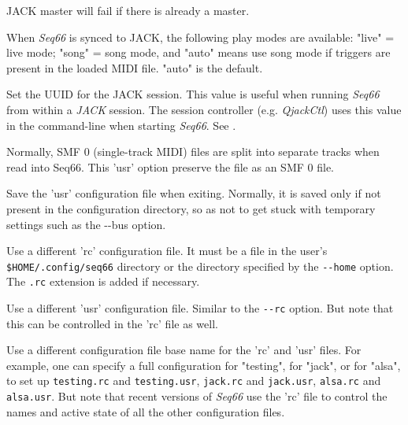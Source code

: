       JACK master will fail if there is already a master.


      When \textsl{Seq66} is synced to JACK, the following play modes
      are available: "live" = live mode; "song" = song mode, and "auto" means
      use song mode if triggers are present in the loaded MIDI file. "auto" is
      the default.


      Set the UUID for the JACK session.  This value is useful when
      running \textsl{Seq66} from within a \textsl{JACK} session.
      The session controller (e.g. \textsl{QjackCtl}) uses this value in the
      command-line when starting \textsl{Seq66}.
      See .

      Normally, SMF 0 (single-track MIDI) files are split into separate tracks
      when read into Seq66.  This 'usr' option preserve the file as an SMF 0
      file.

      Save the 'usr' configuration file when exiting.
      Normally, it is saved only if not present in the configuration directory,
      so as not to get stuck with temporary settings such as the -{}-bus option.


      Use a different 'rc' configuration file.
      It must be a file in the user's \texttt{\$HOME/.config/seq66}
      directory or the directory specified by the \texttt{-{}-home} option.
      The \texttt{.rc} extension is added if necessary.

      Use a different 'usr' configuration file.  Similar to the \texttt{-{}-rc}
      option. But note that this can be controlled in the 'rc' file as
      well.

      Use a different configuration file base name for the 'rc' and 'usr'
      files.  For example, one can specify a full configuration for "testing",
      for "jack", or for "alsa", to set up
      \texttt{testing.rc} and \texttt{testing.usr},
      \texttt{jack.rc} and \texttt{jack.usr},
      \texttt{alsa.rc} and \texttt{alsa.usr}.
      But note that recent versions of \textsl{Seq66} use the 'rc' file
      to control the names and active state of all the other configuration
      files.

